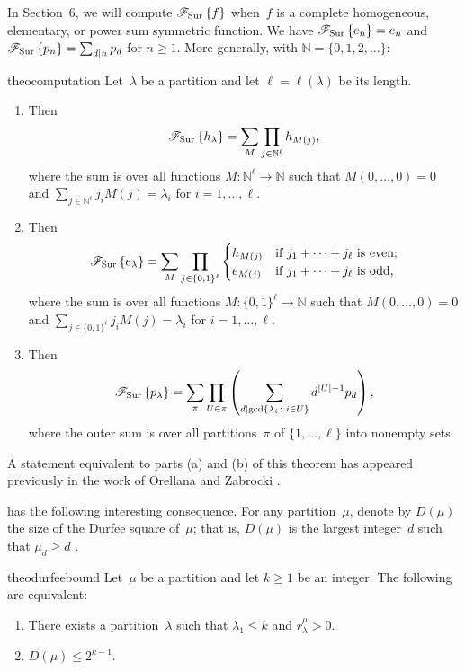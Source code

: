 \documentclass[11pt]{article}
\theoremstyle{definition}
\numberwithin{equation}{section}
\newcommand{\N}{\mathbb{N}}
\newcommand{\Sur}{\mathchoice{\operatorname{Sur}}{\operatorname{Sur}}{\mathrm{Sur}}{\mathrm{Sur}}}
\newcommand{\FSur}[1]{\mathscr{F}_{\Sur}\left\{#1\right\}}
\begin{document}
In Section~6, we will compute $\FSur{f}$ when~$f$ is a complete homogeneous, elementary, or power sum symmetric function. We have $\FSur{e_n} = e_n$ and $\FSur{p_n} = \sum_{d \mid n} p_d$ for $n \geq 1$. More generally, with $\N = \{0, 1, 2, \ldots\}$:

\begin{restatable}{theo}{computation}\label{theorem:computation}
Let~$\lambda$ be a partition and let $\ell = \ell(\lambda)$ be its length.
\begin{enumerate}[label=(\alph*)]
    \item \label{item:fsurh} Then \[\FSur{h_\lambda} = \sum_{M} \prod_{j \in \N^\ell} h_{M(j)},\] where the sum is over all functions $M\colon \N^\ell \to \N$ such that $M(0, \ldots, 0) = 0$ and $\sum_{j \in \N^\ell} j_i M(j) = \lambda_i$ for $i = 1, \ldots, \ell$.
    \item \label{item:fsure} Then \[\FSur{e_\lambda} = \sum_{M} \prod_{j \in \{0, 1\}^\ell}\begin{cases}
    h_{M(j)} & \mbox{if $j_1 + \cdots + j_\ell$ is even;} \\
    e_{M(j)} & \mbox{if $j_1 + \cdots + j_\ell$ is odd,}
    \end{cases}\] where the sum is over all functions $M \colon \{0, 1\}^\ell \to \N$ such that $M(0, \ldots, 0) = 0$ and $\sum_{j \in \{0, 1\}^\ell} j_i M(j) = \lambda_i$ for $i = 1, \ldots, \ell$.
    \item \label{item:fsurp} Then \[\FSur{p_\lambda} = \sum_{\pi} \prod_{U \in \pi}\left(\sum_{d \mid \gcd\{\lambda_i \colon i \in U\}} d^{|U| - 1} p_d\right),\] where the outer sum is over all partitions~$\pi$ of $\{1, \ldots, \ell\}$ into nonempty sets.
\end{enumerate}
\end{restatable}

A statement equivalent to parts (a) and (b) of this theorem has appeared previously in the work of Orellana and Zabrocki \cite[Equation~(6)]{MR4245137}.

 has the following interesting consequence. For any partition~$\mu$, denote by $D(\mu)$ the size of the Durfee square of~$\mu$; that is, $D(\mu)$ is the largest integer~$d$ such that $\mu_{d} \geq d$ \cite[Chapter~8]{MR2122332}.

\begin{restatable}{theo}{durfeebound}\label{theorem:durfeebound}
    Let~$\mu$ be a partition and let $k \geq 1$ be an integer. The following are equivalent:
    \begin{enumerate}[label=(\Alph*)]
        \item There exists a partition~$\lambda$ such that $\lambda_1 \leq k$ and $r_{\lambda}^\mu > 0$.
        \item $D(\mu) \leq 2^{k - 1}$.
    \end{enumerate}
\end{restatable}
\end{document}
